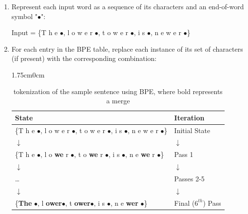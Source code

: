 \begin{enumerate}
  \item Represent each input word as a sequence of its characters and an end-of-word symbol "$\bullet$":

    \hspace*{1cm}Input = \{T h e $\bullet$, l o w e r $\bullet$, t o w e r $\bullet$, i s $\bullet$, n e w e r $\bullet$\}
  
  \item For each entry in the BPE table, replace each instance of its set of characters (if present) with the corresponding combination:

\begin{table}[h]
    \begin{adjustwidth}{1.75cm}{0cm} %
        \begin{tabular}{l|l}
            \textbf{State} & \textbf{Iteration} \\
            \hline
            \{T h e $\bullet$, l o w e r $\bullet$, t o w e r $\bullet$, i s $\bullet$, n e w e r $\bullet$\} & Initial State \\
            \hspace*{3.5cm} $\downarrow$ & \hspace*{0.5cm} $\downarrow$ \\
            \{T h e $\bullet$, l o \textbf{we} r $\bullet$, t o \textbf{we} r $\bullet$, i s $\bullet$, n e \textbf{we} r $\bullet$\} & Pass 1 \\
            \hspace*{3.5cm} $\downarrow$ & \hspace*{0.5cm} $\downarrow$ \\
            \hspace*{3.5cm} \dots & Passes 2-5 \\
            \hspace*{3.5cm} $\downarrow$ & \hspace*{0.5cm} $\downarrow$ \\
            \{\textbf{The} $\bullet$, l \textbf{ower$\bullet$}, t \textbf{ower$\bullet$}, i s $\bullet$, n e \textbf{wer} $\bullet$\} & Final ($6^{th}$) Pass \\
        \end{tabular}
        \caption{tokenization of the sample sentence using BPE, where bold represents a merge}
    \end{adjustwidth}
\end{table}

\end{enumerate}


